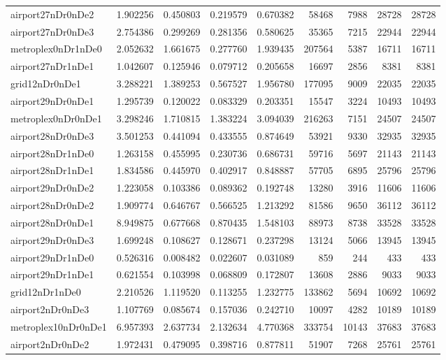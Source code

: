 \begin{longtable}{|l|r|r|r|r|r|r|r|r|}
airport27nDr0nDe2 & 1.902256 & 0.450803 & 0.219579 & 0.670382 & 58468 & 7988 & 28728 & 28728 \\
airport27nDr0nDe3 & 2.754386 & 0.299269 & 0.281356 & 0.580625 & 35365 & 7215 & 22944 & 22944 \\
metroplex0nDr1nDe0 & 2.052632 & 1.661675 & 0.277760 & 1.939435 & 207564 & 5387 & 16711 & 16711 \\
airport27nDr1nDe1 & 1.042607 & 0.125946 & 0.079712 & 0.205658 & 16697 & 2856 & 8381 & 8381 \\
grid12nDr0nDe1 & 3.288221 & 1.389253 & 0.567527 & 1.956780 & 177095 & 9009 & 22035 & 22035 \\
airport29nDr0nDe1 & 1.295739 & 0.120022 & 0.083329 & 0.203351 & 15547 & 3224 & 10493 & 10493 \\
metroplex0nDr0nDe1 & 3.298246 & 1.710815 & 1.383224 & 3.094039 & 216263 & 7151 & 24507 & 24507 \\
airport28nDr0nDe3 & 3.501253 & 0.441094 & 0.433555 & 0.874649 & 53921 & 9330 & 32935 & 32935 \\
airport28nDr1nDe0 & 1.263158 & 0.455995 & 0.230736 & 0.686731 & 59716 & 5697 & 21143 & 21143 \\
airport28nDr1nDe1 & 1.834586 & 0.445970 & 0.402917 & 0.848887 & 57705 & 6895 & 25796 & 25796 \\
airport29nDr0nDe2 & 1.223058 & 0.103386 & 0.089362 & 0.192748 & 13280 & 3916 & 11606 & 11606 \\
airport28nDr0nDe2 & 1.909774 & 0.646767 & 0.566525 & 1.213292 & 81586 & 9650 & 36112 & 36112 \\
airport28nDr0nDe1 & 8.949875 & 0.677668 & 0.870435 & 1.548103 & 88973 & 8738 & 33528 & 33528 \\
airport29nDr0nDe3 & 1.699248 & 0.108627 & 0.128671 & 0.237298 & 13124 & 5066 & 13945 & 13945 \\
airport29nDr1nDe0 & 0.526316 & 0.008482 & 0.022607 & 0.031089 & 859 & 244 & 433 & 433 \\
airport29nDr1nDe1 & 0.621554 & 0.103998 & 0.068809 & 0.172807 & 13608 & 2886 & 9033 & 9033 \\
grid12nDr1nDe0 & 2.210526 & 1.119520 & 0.113255 & 1.232775 & 133862 & 5694 & 10692 & 10692 \\
airport2nDr0nDe3 & 1.107769 & 0.085674 & 0.157036 & 0.242710 & 10097 & 4282 & 10189 & 10189 \\
metroplex10nDr0nDe1 & 6.957393 & 2.637734 & 2.132634 & 4.770368 & 333754 & 10143 & 37683 & 37683 \\
airport2nDr0nDe2 & 1.972431 & 0.479095 & 0.398716 & 0.877811 & 51907 & 7268 & 25761 & 25761 \\

\end{longtable}
